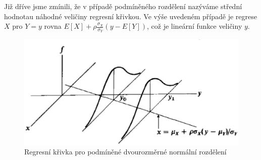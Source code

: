 Již dříve jsme zmínili, že v případě podmíněného rozdělení nazýváme střední hodnotau náhodné veličiny regresní křivkou. Ve výše uvedeném případě je regrese $X$ pro $Y = y$ rovna $E[X] + \rho \frac{\sigma_X}{\sigma_Y}(y - E[Y])$, což je lineární funkce veličiny $y$.

\begin{figure}[htp]
\centering
\includegraphics[scale = 0.5]{pictures/bivariate_normal_regression.eps}
\caption{Regresní křivka pro podmíněné dvourozměrné normální rozdělení}
\label{bivariate_normal_regression}
\end{figure}  
 

